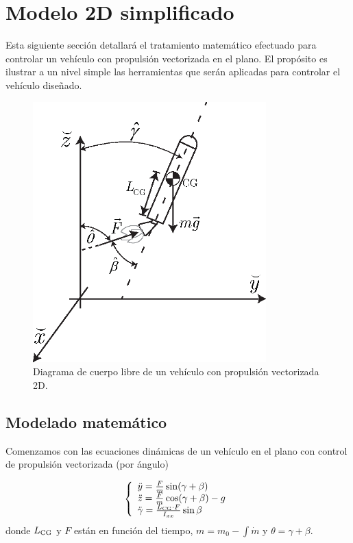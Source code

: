 
\section{Modelo 2D simplificado}

Esta siguiente sección detallará el tratamiento matemático efectuado para controlar un vehículo con propulsión vectorizada en el plano. El propósito es ilustrar a un nivel simple las herramientas que serán aplicadas para controlar el vehículo diseñado.

\begin{figure}[htb!]
	\centering
	\includegraphics[width=9cm]{fig/rocketFBD.eps}
	\caption{Diagrama de cuerpo libre de un vehículo con propulsión vectorizada 2D.}
	\label{fig:FBD2D}
\end{figure}


\subsection{Modelado matemático}
Comenzamos con las ecuaciones dinámicas de un vehículo en el plano con control de propulsión vectorizada (por ángulo)

\[
\left\{
\begin{array}{l}
	\ddot{y}=\frac{F}{m} \sin(\gamma+\beta) \\
	\ddot{z}=\frac{F}{m} \cos (\gamma+\beta)-g \\
	\ddot{\gamma} = \frac{L_{{\mathrm{CG}}}\cdot F}{I_{xx}}\sin\beta
\end{array}
\right.
\]
donde \(L_{\mathrm{CG}}\) y \(F\) están en función del tiempo, $m =m_0 - \int \dot{m} $ y $\theta = \gamma+\beta$. 

